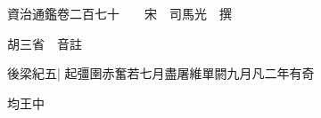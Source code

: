 






























































資治通鑑卷二百七十　　宋　司馬光　撰

胡三省　音註

後梁紀五|{
	起彊圉赤奮若七月盡屠維單閼九月凡二年有奇}


均王中

